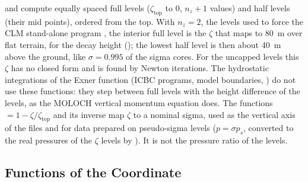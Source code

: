  and
 compute equally spaced full levels
($\zeta_\text{top}$ to 0, $n_z+1$ values) and half levels (their mid
points), ordered from the top. With $n_z = 2$, the levels used to force the
CLM stand-alone program , the interior full level is the
$\zeta$ that  maps to 80~m over flat terrain, for the decay
height  (); the lowest half level is then about
40~m above the ground, like $\sigma = 0.995$ of the sigma cores. For the
uncapped levels this $\zeta$ has no closed form and is found by Newton
iterations. The hydrostatic integrations of the Exner function (ICBC
programs, model boundaries, ) do not use these functions:
they step between full levels with the height difference of the levels,
as the MOLOCH vertical momentum equation does. The
functions  $= 1 - \zeta/\zeta_\text{top}$ and its inverse
 map $\zeta$ to a nominal sigma, used as the vertical axis
of the files and for data prepared on pseudo-sigma levels
($p = \sigma p_s$, converted to the real pressures of the $\zeta$ levels by
). It is not the pressure ratio of the levels.

\subsection{Functions of the Coordinate}

